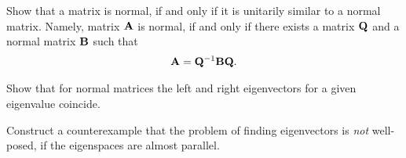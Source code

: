 
\begin{Sheet}
  \label{sheet2}

  \begin{Problem}
    Show that a matrix is normal, if and only if it is unitarily
    similar to a normal matrix. Namely, matrix $\mathbf A$ is normal, if
    and only if there exists a matrix $\mathbf Q$ and a normal matrix
    $\mathbf B$ such that
    \begin{gather*}
      \mathbf A = \mathbf Q^{-1} \mathbf B \mathbf Q.
    \end{gather*}
  \end{Problem}

  \begin{Problem}
    Show that for normal matrices the left and right eigenvectors for
    a given eigenvalue coincide.
  \end{Problem}

  \begin{Problem}
    Construct a counterexample that the problem of finding
    eigenvectors is \textit{not} well-posed, if the eigenspaces are
    almost parallel.
  \end{Problem}


\end{Sheet}
